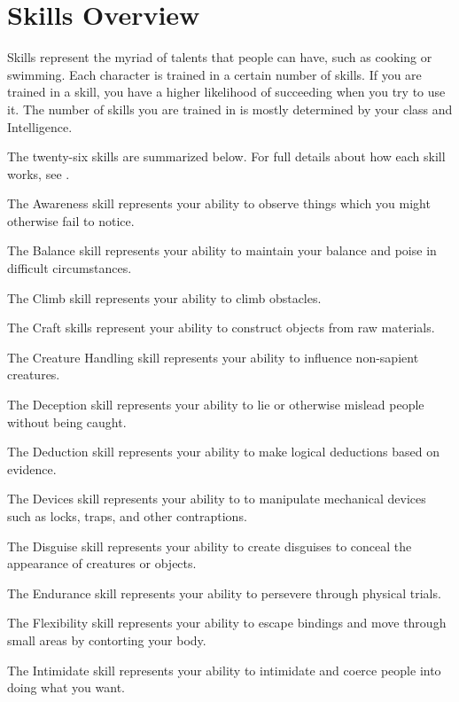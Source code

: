\section{Skills Overview}
    Skills represent the myriad of talents that people can have, such as cooking or swimming.
    Each character is trained in a certain number of skills.
    If you are trained in a skill, you have a higher likelihood of succeeding when you try to use it.
    The number of skills you are trained in is mostly determined by your class and Intelligence.

    The twenty-six skills are summarized below.
    For full details about how each skill works, see .

    \begin{raggeditemize}
        \item The Awareness skill represents your ability to observe things which you might otherwise fail to notice.
        \item The Balance skill represents your ability to maintain your balance and poise in difficult circumstances.
        \item The Climb skill represents your ability to climb obstacles.
        \item The Craft skills represent your ability to construct objects from raw materials.
        \item The Creature Handling skill represents your ability to influence non-sapient creatures.
        \item The Deception skill represents your ability to lie or otherwise mislead people without being caught.
        \item The Deduction skill represents your ability to make logical deductions based on evidence.
        \item The Devices skill represents your ability to to manipulate mechanical devices such as locks, traps, and other contraptions.
        \item The Disguise skill represents your ability to create disguises to conceal the appearance of creatures or objects.
        \item The Endurance skill represents your ability to persevere through physical trials.
        \item The Flexibility skill represents your ability to escape bindings and move through small areas by contorting your body.
        \item The Intimidate skill represents your ability to intimidate and coerce people into doing what you want.

\end{raggeditemize}
